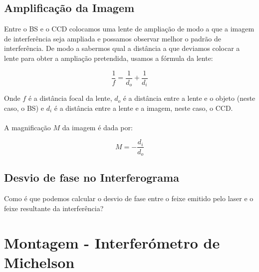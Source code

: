 \documentclass{article}
\begin{document}
\begin{multicols}{2}
\subsection{Amplificação da Imagem}

Entre o BS e o CCD colocamos uma lente de ampliação de modo a que a imagem de interferência seja ampliada e possamos observar melhor o padrão de interferência.
De modo a sabermos qual a distância a que deviamos colocar a lente para obter a ampliação pretendida, usamos a fórmula da lente:

\[ \frac{1}{f} = \frac{1}{d_o} + \frac{1}{d_i} \]

Onde $f$ é a distância focal da lente, $d_o$ é a distância entre a lente e o objeto (neste caso, o BS) e $d_i$ é a distância entre a lente e a imagem, neste caso, o CCD.
\paragraph{}
A magnificação $M$ da imagem é dada por:

\[ M = - \frac{d_i}{d_o} \]

\subsection{Desvio de fase no Interferograma}

Como é que podemos calcular o desvio de fase entre o feixe emitido pelo laser e o feixe resultante da interferência?



\end{multicols}



\newpage

\section{Montagem - Interferómetro de Michelson}

\vspace{3cm}
\end{document}
